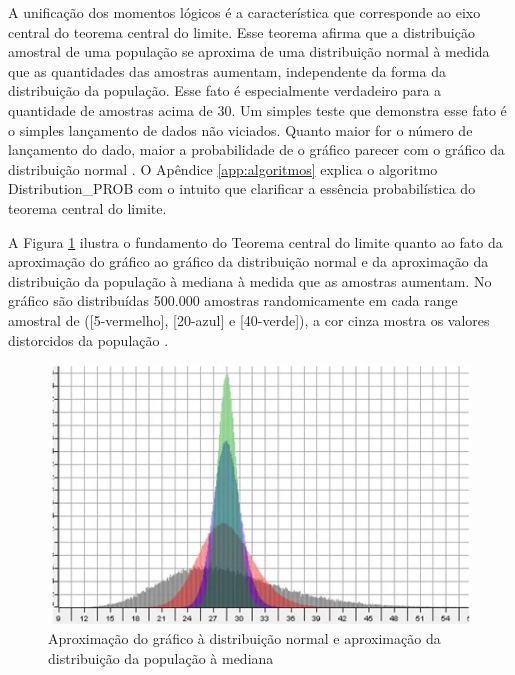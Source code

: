 A unificação dos momentos lógicos é a característica que corresponde ao eixo central do teorema central do limite. Esse teorema afirma que a distribuição amostral de uma população se aproxima de uma distribuição normal à medida que as quantidades das amostras aumentam, independente da forma da distribuição da população. Esse fato é especialmente verdadeiro para a quantidade de amostras acima de 30. Um simples teste que demonstra esse fato é o simples lançamento de dados não viciados. Quanto maior for o número de lançamento do dado, maior a probabilidade de o gráfico parecer com o gráfico da distribuição normal \cite{statisticshowto_teorema_central_limite}. O Apêndice \ref{app:algoritmos} explica o algoritmo Distribution\_PROB com o intuito que clarificar a essência probabilística do teorema central do limite. 

A Figura \ref{fig:statisticsbyjim_central_limit_theorem} ilustra o fundamento do Teorema central do limite quanto ao fato da aproximação do gráfico ao gráfico da distribuição normal e da aproximação da distribuição da população à mediana à medida que as amostras aumentam. No gráfico são distribuídas 500.000 amostras randomicamente em cada range amostral de ([5-vermelho], [20-azul] e [40-verde]), a cor cinza mostra os valores distorcidos da população \cite{statisticsbyjim_central_limite_theorem_explainded}.

\begin{figure}[H]
\caption{Aproximação do gráfico à distribuição normal e aproximação da distribuição da população à mediana}
\label{fig:statisticsbyjim_central_limit_theorem}
\centering
\includegraphics[scale=1]{sections/images/statisticsbyjim_central_limit_theorem.jpg}
\end{figure}

